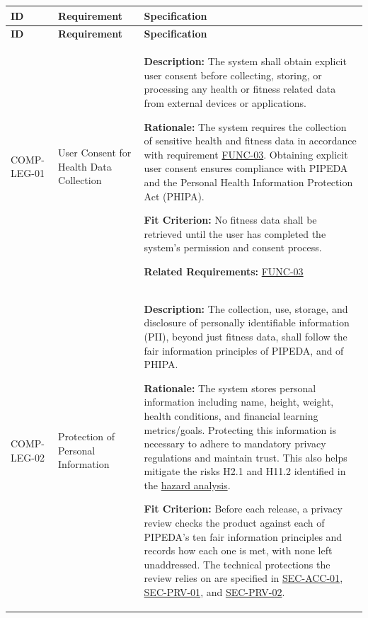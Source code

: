 \documentclass[12pt]{article}
\newcommand{\acr}[3]{\phantomsection\label{acr:#1}#2 (#3)}
\begin{document}
\small
\setlength{\tabcolsep}{4pt}
\begin{xltabular}{\textwidth}{|p{2.6cm}|p{3.4cm}|X|}
\hline
\textbf{ID} & \textbf{Requirement} & \textbf{Specification} \\
\hline
\endfirsthead
\hline
\textbf{ID} & \textbf{Requirement} & \textbf{Specification} \\
\hline
\endhead

COMP-LEG-01\hypertarget{req:COMP-LEG-01}{} &
User Consent for Health Data Collection &
\textbf{Description:} The system shall obtain explicit user consent before collecting, storing, or processing any health or fitness related data from external devices or applications.

\textbf{Rationale:} The system requires the collection of sensitive health and fitness data in accordance with requirement \hyperlink{req:FUNC-03}{FUNC-03}. Obtaining explicit user consent ensures compliance with PIPEDA and the \acr{PHIPA}{Personal Health Information Protection Act}{PHIPA}.

\textbf{Fit Criterion:} No fitness data shall be retrieved until the user has completed the system's permission and consent process.

\textbf{Related Requirements:} \hyperlink{req:FUNC-03}{FUNC-03}\\
\hline

COMP-LEG-02\hypertarget{req:COMP-LEG-02}{} &
Protection of Personal Information &
\textbf{Description:} The collection, use, storage, and disclosure of \acr{PII}{personally identifiable information}{PII}, beyond just fitness data, shall follow the fair information principles of PIPEDA, and of PHIPA.

\textbf{Rationale:} The system stores personal information including name, height, weight, health conditions, and financial learning metrics/goals. Protecting this information is necessary to adhere to mandatory privacy regulations and maintain trust. This also helps mitigate the risks H2.1 and H11.2 identified in the \href{https://github.com/arjunkarthik123/fitness-finance-application/blob/main/pdfs/HazardAnalysis/HazardAnalysis.pdf}{hazard analysis}.

\textbf{Fit Criterion:} Before each release, a privacy review checks the product against each of PIPEDA's ten fair information principles and records how each one is met, with none left unaddressed. The technical protections the review relies on are specified in \hyperlink{req:SEC-ACC-01}{SEC-ACC-01}, \hyperlink{req:SEC-PRV-01}{SEC-PRV-01}, and \hyperlink{req:SEC-PRV-02}{SEC-PRV-02}.


\end{xltabular}
\end{document}
